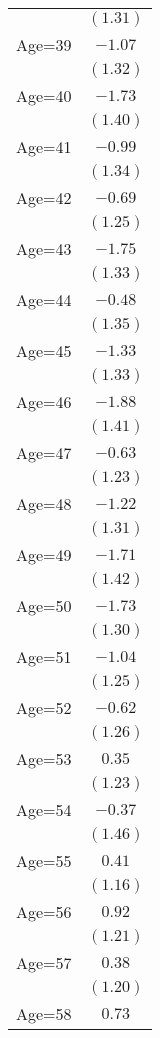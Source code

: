 \documentclass[fullpage]{paper}
\begin{document}
\begin{center}
\begin{longtable}{l c }
            & $(1.31)$ \\
Age=39      & $-1.07$  \\
            & $(1.32)$ \\
Age=40      & $-1.73$  \\
            & $(1.40)$ \\
Age=41      & $-0.99$  \\
            & $(1.34)$ \\
Age=42      & $-0.69$  \\
            & $(1.25)$ \\
Age=43      & $-1.75$  \\
            & $(1.33)$ \\
Age=44      & $-0.48$  \\
            & $(1.35)$ \\
Age=45      & $-1.33$  \\
            & $(1.33)$ \\
Age=46      & $-1.88$  \\
            & $(1.41)$ \\
Age=47      & $-0.63$  \\
            & $(1.23)$ \\
Age=48      & $-1.22$  \\
            & $(1.31)$ \\
Age=49      & $-1.71$  \\
            & $(1.42)$ \\
Age=50      & $-1.73$  \\
            & $(1.30)$ \\
Age=51      & $-1.04$  \\
            & $(1.25)$ \\
Age=52      & $-0.62$  \\
            & $(1.26)$ \\
Age=53      & $0.35$   \\
            & $(1.23)$ \\
Age=54      & $-0.37$  \\
            & $(1.46)$ \\
Age=55      & $0.41$   \\
            & $(1.16)$ \\
Age=56      & $0.92$   \\
            & $(1.21)$ \\
Age=57      & $0.38$   \\
            & $(1.20)$ \\
Age=58      & $0.73$   \\

\end{longtable}
\end{center}
\end{document}
